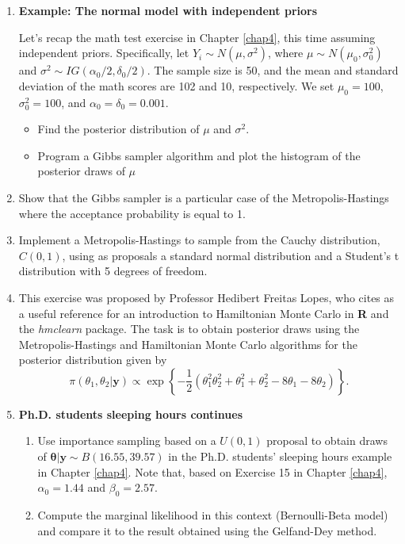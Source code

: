 \begin{enumerate}
	\item \textbf{Example: The normal model with independent priors}
	
	Let's recap the math test exercise in Chapter \ref{chap4}, this time assuming independent priors. Specifically, let $Y_i \sim N(\mu, \sigma^2)$, where $\mu \sim N(\mu_0, \sigma_0^2)$ and $\sigma^2 \sim IG(\alpha_0 / 2, \delta_0 / 2)$. The sample size is 50, and the mean and standard deviation of the math scores are 102 and 10, respectively. We set $\mu_0 = 100$, $\sigma_0^2 = 100$, and $\alpha_0 = \delta_0 = 0.001$.
	
	\begin{itemize}
		\item Find the posterior distribution of $\mu$ and $\sigma^2$.
		\item Program a Gibbs sampler algorithm and plot the histogram of the posterior draws of $\mu$
	\end{itemize}

	\item Show that the Gibbs sampler is a particular case of the Metropolis-Hastings where the acceptance probability is equal to 1.
	
	\item Implement a Metropolis-Hastings to sample from the Cauchy distribution, $C(0,1)$, using as proposals a standard normal distribution and a Student's t distribution with 5 degrees of freedom.
	
	\item This exercise was proposed by Professor Hedibert Freitas Lopes, who cites \cite{thomas2021learning} as a useful reference for an introduction to Hamiltonian Monte Carlo in \textbf{R} and the \textit{hmclearn} package. The task is to obtain posterior draws using the Metropolis-Hastings and Hamiltonian Monte Carlo algorithms for the posterior distribution given by 
	\[
	\pi(\theta_1,\theta_2|\bm{y}) \propto \exp\left\{-\frac{1}{2}(\theta_1^2\theta_2^2 + \theta_1^2 + \theta_2^2 - 8\theta_1 - 8\theta_2)\right\}.
	\]
	
 \item \textbf{Ph.D. students sleeping hours continues}
\begin{enumerate}
	\item Use importance sampling based on a $U(0,1)$ proposal to obtain draws of $\bm{\theta}|\bm{y} \sim B(16.55,39.57)$ in the Ph.D. students' sleeping hours example in Chapter \ref{chap4}. Note that, based on Exercise 15 in Chapter \ref{chap4}, $\alpha_0 = 1.44$ and $\beta_0 = 2.57$.
	\item Compute the marginal likelihood in this context (Bernoulli-Beta model) and compare it to the result obtained using the Gelfand-Dey method.
\end{enumerate}
    
	
\end{enumerate}



